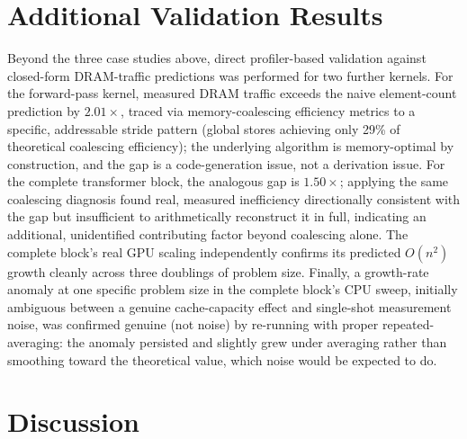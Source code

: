 \documentclass[conference]{IEEEtran}
\begin{document}
\section{Additional Validation Results}
\label{sec:additional}

Beyond the three case studies above, direct profiler-based validation
against closed-form DRAM-traffic predictions was performed for two
further kernels. For the forward-pass kernel, measured DRAM traffic
exceeds the naive element-count prediction by $2.01\times$, traced via
memory-coalescing efficiency metrics to a specific, addressable stride
pattern (global stores achieving only 29\% of theoretical coalescing
efficiency); the underlying algorithm is memory-optimal by
construction, and the gap is a code-generation issue, not a derivation
issue. For the complete transformer block, the analogous gap is
$1.50\times$; applying the same coalescing diagnosis found real,
measured inefficiency directionally consistent with the gap but
insufficient to arithmetically reconstruct it in full, indicating an
additional, unidentified contributing factor beyond coalescing alone.
The complete block's real GPU scaling independently confirms its
predicted $O(n^2)$ growth cleanly across three doublings of problem
size. Finally, a growth-rate anomaly at one specific problem size in
the complete block's CPU sweep, initially ambiguous between a genuine
cache-capacity effect and single-shot measurement noise, was confirmed
genuine (not noise) by re-running with proper repeated-averaging: the
anomaly persisted and slightly grew under averaging rather than
smoothing toward the theoretical value, which noise would be expected
to do.

\section{Discussion}
\label{sec:discussion}
\end{document}
